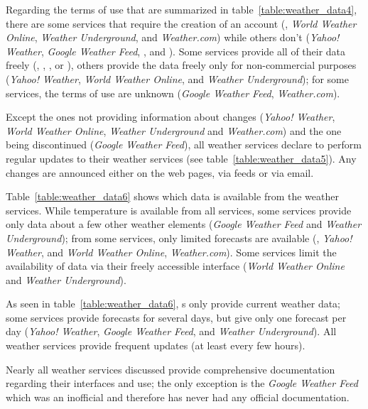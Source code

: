 Regarding the terms of use that are summarized in table~\ref{table:weather_data4}, there are some services that require the creation of an account (, \emph{World Weather Online}, \emph{Weather Underground}, and \emph{Weather.com}) while others don't (\emph{Yahoo! Weather}, \emph{Google Weather Feed}, \yrno, and ). Some services provide all of their data freely (, \yrno, , or ), others provide the data freely only for non-commercial purposes (\emph{Yahoo! Weather}, \emph{World Weather Online}, and \emph{Weather Underground}); for some services, the terms of use are unknown (\emph{Google Weather Feed}, \emph{Weather.com}).

Except the ones not providing information about changes (\emph{Yahoo! Weather}, \emph{World Weather Online}, \emph{Weather Underground} and \emph{Weather.com}) and the one being discontinued (\emph{Google Weather Feed}), all weather services declare to perform regular updates to their weather services (see table~\ref{table:weather_data5}). Any changes are announced either on the web pages, via  feeds or via email.

Table~\ref{table:weather_data6} shows which data is available from the weather services. While temperature is available from all services, some services provide only data about a few other weather elements (\emph{Google Weather Feed} and \emph{Weather Underground}); from some services, only limited forecasts are available (, \emph{Yahoo! Weather}, and \emph{World Weather Online}, \emph{Weather.com}). Some services limit the availability of data via their freely accessible interface (\emph{World Weather Online} and \emph{Weather Underground}).

As seen in table~\ref{table:weather_data6}, s only provide current weather data; some services provide forecasts for several days, but give only one forecast per day (\emph{Yahoo! Weather}, \emph{Google Weather Feed}, and \emph{Weather Underground}). All weather services provide frequent updates (at least every few hours).

Nearly all weather services discussed provide comprehensive documentation regarding their interfaces and use; the only exception is the \emph{Google Weather Feed} which was an inofficial  and therefore has never had any official documentation.

